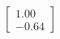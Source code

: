 \documentclass[preview]{standalone}
\begin{document}
\begin{align*}
\begin{bmatrix} 1.00 \\ -0.64 \end{bmatrix}
\end{align*}
\end{document}
